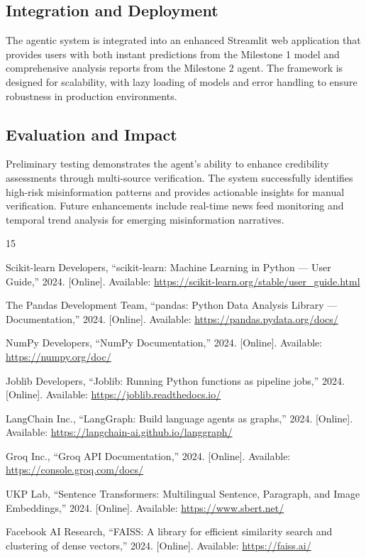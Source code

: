\documentclass[conference]{IEEEtran}
\begin{document}
\subsection{Integration and Deployment}

The agentic system is integrated into an enhanced Streamlit web application that provides users with both instant predictions from the Milestone 1 model and comprehensive analysis reports from the Milestone 2 agent. The framework is designed for scalability, with lazy loading of models and error handling to ensure robustness in production environments.

\subsection{Evaluation and Impact}

Preliminary testing demonstrates the agent's ability to enhance credibility assessments through multi-source verification. The system successfully identifies high-risk misinformation patterns and provides actionable insights for manual verification. Future enhancements include real-time news feed monitoring and temporal trend analysis for emerging misinformation narratives.

\begin{thebibliography}{15}

Scikit-learn Developers, ``scikit-learn: Machine Learning in Python — User Guide,'' 2024. [Online]. Available: \url{https://scikit-learn.org/stable/user_guide.html}

The Pandas Development Team, ``pandas: Python Data Analysis Library — Documentation,'' 2024. [Online]. Available: \url{https://pandas.pydata.org/docs/}

NumPy Developers, ``NumPy Documentation,'' 2024. [Online]. Available: \url{https://numpy.org/doc/}

Joblib Developers, ``Joblib: Running Python functions as pipeline jobs,'' 2024. [Online]. Available: \url{https://joblib.readthedocs.io/}

LangChain Inc., ``LangGraph: Build language agents as graphs,'' 2024. [Online]. Available: \url{https://langchain-ai.github.io/langgraph/}

Groq Inc., ``Groq API Documentation,'' 2024. [Online]. Available: \url{https://console.groq.com/docs/}

UKP Lab, ``Sentence Transformers: Multilingual Sentence, Paragraph, and Image Embeddings,'' 2024. [Online]. Available: \url{https://www.sbert.net/}

Facebook AI Research, ``FAISS: A library for efficient similarity search and clustering of dense vectors,'' 2024. [Online]. Available: \url{https://faiss.ai/}
 
\end{thebibliography}
\end{document}
